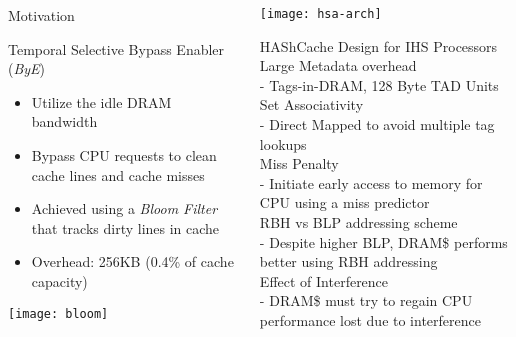 \documentclass[final,t]{beamer}
\begin{document}
\begin{frame}[t,fragile]{}
\begin{columns}[t]
\begin{column}{.47\linewidth}
\begin{exampleblock}{Motivation}
    \end{exampleblock}
     
    
    

    \begin{exampleblock}{Temporal Selective Bypass Enabler (\textit{ByE})}
    \begin{itemize}
	    \item Utilize the idle DRAM bandwidth
	    \item Bypass CPU requests to clean cache lines and cache misses
	    \item Achieved using a \textit{Bloom Filter} that tracks dirty lines in cache
	    \item Overhead: 256KB (0.4\% of cache capacity)
    \end{itemize}
    \vspace{\baselineskip}
    \centering
	\texttt{[image: bloom]}
	\end{exampleblock}
\end{column}


\begin{column}{.47\linewidth}

	\centering
   \texttt{[image: hsa-arch]}

    \begin{exampleblock}{HAShCache Design for IHS Processors}
        {\small Large Metadata overhead} \\
        	\qquad- Tags-in-DRAM, 128 Byte TAD Units \\
        {\small Set Associativity} \\
        	\qquad- Direct Mapped to avoid multiple tag lookups \\
        {\small Miss Penalty} \\
        	\qquad- Initiate early access to memory for CPU using a miss predictor \\
        {\small RBH vs BLP addressing scheme} \\
	        \qquad- Despite higher BLP, DRAM\$ performs better using RBH addressing\\
        {\small Effect of Interference} \\
        	\qquad- DRAM\$ must try to regain CPU performance lost due to interference\\
    \end{exampleblock}
    

\end{column}
\end{columns}
\end{frame}
\end{document}
